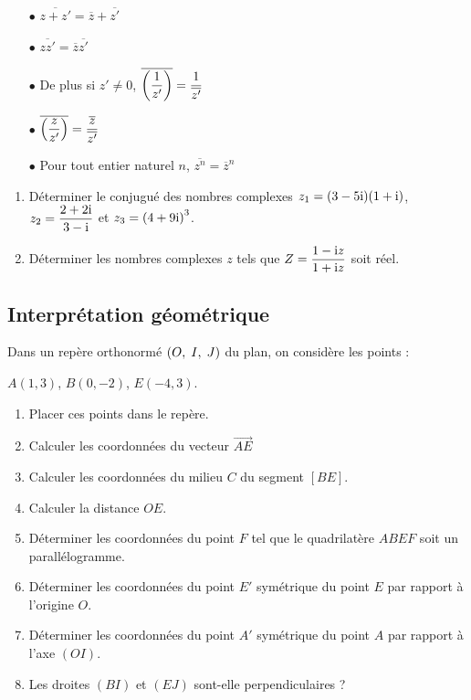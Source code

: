 \medskip

\begin{itemize}
\item[$  \bullet$]  $ \overline{z+z'} =\overline{z}+\overline{z'}$
\item[$  \bullet$]    $ \overline{z z'} =\overline{z} \overline{z'}$

\medskip

\item[$  \bullet$]  De plus si $ z'\neq 0 $, \quad $\overline{\left( \dfrac{1}{z'} \right)}= \dfrac{1}{\overline{z'}}$
\item[$  \bullet$]   $\overline{\left( \dfrac{z}{z'} \right)}= \dfrac{\overline{z}}{\overline{z'}}$
 \item[$  \bullet$] Pour tout entier naturel $ n $, \quad $ \overline{z^n} =\overline{z}^n$
\end{itemize}
\medskip

\begin{exercice}
\begin{enumerate}
\item Déterminer le conjugué des nombres complexes $ z_1= (3-5\text{i})(1+\text{i}) $, $ z_2= \dfrac{2+2\text{i}}{3-\text{i} } $ et   $z_3=\left(4+9\text{i}\right)^3 $.
\item Déterminer les nombres complexes $ z $ tels que\; $ Z=\dfrac{1-\text{i} z}{1+\text{i} z} $  soit réel.
\end{enumerate}
\end{exercice}
\subsection{ Interprétation géométrique }
\begin{lemma}
Dans un repère orthonormé   $ \left(O,\; I, \; J\right) $ du plan, on considère les points : 

$ A(1, 3) $,\; $ B(0, -2) $,\; $ E(-4, 3) $.
\begin{enumerate}
\item Placer ces points dans le repère.
\item Calculer les coordonnées du vecteur $ \overrightarrow{AE} $
\item Calculer les coordonnées du milieu $ C $ du segment  $ [BE] $.
\item Calculer la distance $ OE $.
\item  Déterminer les coordonnées du point $ F $  tel que le quadrilatère  $ ABEF $ soit un parallélogramme.
\item Déterminer les coordonnées du point $ E' $  symétrique du point $ E $ par rapport à l'origine $ O. $
\item Déterminer les coordonnées du point $ A' $  symétrique du point $ A $ par rapport à l'axe $ (OI). $
\item Les droites  $ (BI)$ et $(EJ) $ sont-elle perpendiculaires ?
\end{enumerate}
\end{lemma}
